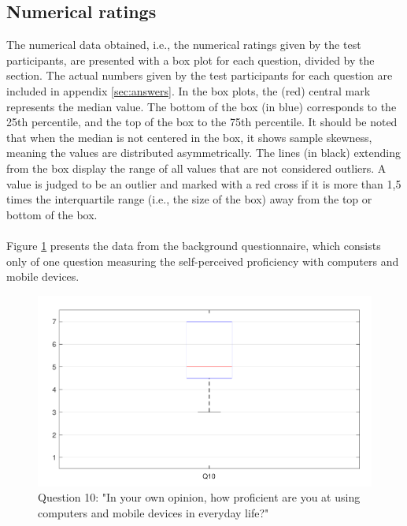 \documentclass[english, 12pt, a4paper, pdftex, elec, utf8]{aaltothesis}
\begin{document}
\subsection{Numerical ratings}

The numerical data obtained, i.e., the numerical ratings given by the test participants, are presented with a box plot for each question, divided by the section. The actual numbers given by the test participants for each question are included in appendix \ref{sec:answers}. In the box plots, the (red) central mark represents the median value. The bottom of the box (in blue) corresponds to the 25th percentile, and the top of the box to the 75th percentile. It should be noted that when the median is not centered in the box, it shows sample skewness, meaning the values are distributed asymmetrically. The lines (in black) extending from the box display the range of all values that are not considered outliers. A value is judged to be an outlier and marked with a red cross if it is more than 1,5 times the interquartile range (i.e., the size of the box) away from the top or bottom of the box. \cite{boxplot} \\\\
Figure \ref{fig:results1} presents the data from the background questionnaire, which consists only of one question measuring the self-perceived proficiency with computers and mobile devices. 
\begin{figure}[b!]
	\centering
	\includegraphics[width=\textwidth]{T2_box1.pdf}
	\caption{Question 10: "In your own opinion, how proficient are you at using computers and mobile devices in everyday life?"}
	\label{fig:results1} 
\end{figure}
\end{document}
